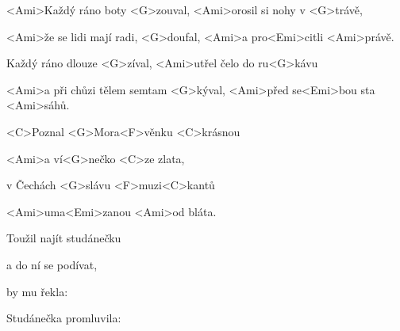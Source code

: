 

\zr
<Ami>Každý ráno boty <G>zouval,
<Ami>orosil si nohy v <G>trávě,

<Ami>že se lidi mají radi, <G>doufal,
<Ami>a pro<Emi>citli <Ami>právě.

Každý ráno dlouze <G>zíval,
<Ami>utřel čelo do ru<G>kávu

<Ami>a při chůzi tělem semtam <G>kýval,
<Ami>před se<Emi>bou sta <Ami>sáhů.
\kr

\zs
<C>Poznal <G>Mora<F>věnku <C>krásnou

<Ami>a ví<G>nečko <C>ze zlata,

v Čechách <G>slávu <F>muzi<C>kantů

<Ami>uma<Emi>zanou <Ami>od bláta.
\ks

\zr \kr

\zs
Toužil najít studánečku

a do ní se podívat,

by mu řekla: 
\ks

\zs
Studánečka promluvila:

\ks

\zr \kr

\kp

